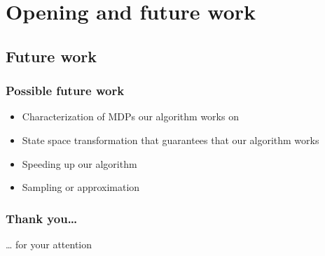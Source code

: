 \documentclass{beamer}
\begin{document}
\section{Opening and future work}
\label{sec-5}
\subsection{Future work}
\label{sec-5_1}
\begin{frame}
\frametitle{Possible future work}
\label{sec-5_1_1}
\begin{itemize}
\item Characterization of MDPs our algorithm works on
\item State space transformation that guarantees that our algorithm works
\item Speeding up our algorithm
\item Sampling or approximation
\end{itemize} %
\end{frame}
\begin{frame}
\frametitle{Thank you\ldots{}}
\label{sec-5_1_2}

    \ldots{} for your attention
\end{frame}
\end{document}
